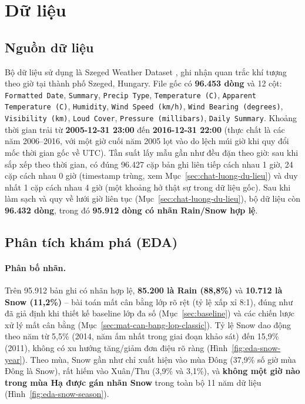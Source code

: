 \section{Dữ liệu}
\label{sec:du-lieu}

\subsection{Nguồn dữ liệu}
\label{sec:nguon-du-lieu}

Bộ dữ liệu sử dụng là Szeged Weather Dataset \cite{szegedweather}, ghi nhận quan trắc khí
tượng theo giờ tại thành phố Szeged, Hungary. File gốc có \textbf{96.453 dòng} và 12 cột:
\texttt{Formatted Date}, \texttt{Summary}, \texttt{Precip Type}, \texttt{Temperature (C)},
\texttt{Apparent Temperature (C)}, \texttt{Humidity}, \texttt{Wind Speed (km/h)},
\texttt{Wind Bearing (degrees)}, \texttt{Visibility (km)}, \texttt{Loud Cover},
\texttt{Pressure (millibars)}, \texttt{Daily Summary}. Khoảng thời gian trải từ
\textbf{2005-12-31 23:00} đến \textbf{2016-12-31 22:00} (thực chất là các năm
2006--2016, với một giờ cuối năm 2005 lọt vào do lệch múi giờ khi quy đổi mốc thời
gian gốc về UTC). Tần suất lấy mẫu gần như đều đặn theo giờ: sau khi sắp xếp theo thời
gian, có đúng 96.427 cặp bản ghi liên tiếp cách nhau 1 giờ, 24 cặp cách nhau 0 giờ (timestamp
trùng, xem Mục~\ref{sec:chat-luong-du-lieu}) và duy nhất 1 cặp cách nhau 4 giờ (một khoảng hở
thật sự trong dữ liệu gốc). Sau khi làm sạch và quy về lưới giờ liên tục
(Mục~\ref{sec:chat-luong-du-lieu}), bộ dữ liệu còn \textbf{96.432 dòng}, trong đó
\textbf{95.912 dòng có nhãn Rain/Snow hợp lệ}.

\subsection{Phân tích khám phá (EDA)}
\label{sec:eda}

\paragraph{Phân bố nhãn.} Trên 95.912 bản ghi có nhãn hợp lệ, \textbf{85.200 là Rain
(88,8\%)} và \textbf{10.712 là Snow (11,2\%)} -- bài toán mất cân bằng lớp rõ rệt
(tỷ lệ xấp xỉ 8:1), đúng như đã giả định khi thiết kế baseline lớp đa số
(Mục~\ref{sec:baseline}) và các chiến lược xử lý mất cân bằng (Mục~\ref{sec:mat-can-bang-lop-classic}).
Tỷ lệ Snow dao động theo năm từ 5,5\% (2014, năm ấm nhất trong giai đoạn khảo sát) đến
15,9\% (2011), không có xu hướng tăng/giảm đơn điệu rõ ràng (Hình~\ref{fig:eda-snow-year}).
Theo mùa, Snow gần như chỉ xuất hiện vào mùa Đông (37,9\% số giờ mùa Đông là Snow), rất
hiếm vào Xuân/Thu (3,9\% và 3,1\%), và \textbf{không một giờ nào trong mùa Hạ được gán
nhãn Snow} trong toàn bộ 11 năm dữ liệu (Hình~\ref{fig:eda-snow-season}).

